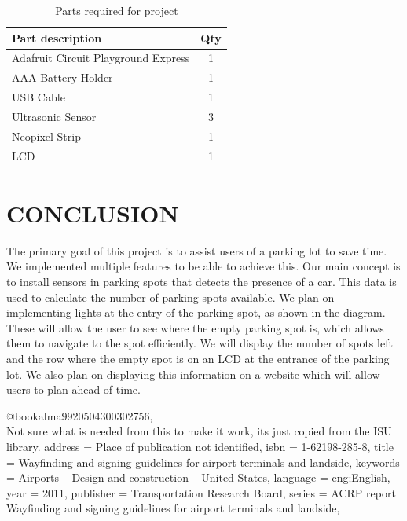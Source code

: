 \documentclass[12pt]{article}
\begin{document}
\begin{table}[!h]
  \caption{Parts required for project}
  \label{table:parts_list}
  \begin{center}
  \begin{tabular}{|p{3in}|c|}
  
  \hline
  Part description & Qty\\
  \hline
  \hline
  Adafruit Circuit Playground Express & 1 \\
  \hline
  AAA Battery Holder & 1 \\
  \hline
  USB Cable & 1 \\
  \hline
  Ultrasonic Sensor & 3 \\
  \hline
  Neopixel Strip & 1 \\
  \hline
  LCD & 1 \\
  \hline
  \end{tabular}
  \end{center}
\end{table}
\section{CONCLUSION}
The primary goal of this project is to assist users of a parking lot to save time. We implemented multiple features to be able to achieve this. Our main concept is to install sensors in parking spots that detects the presence of a car. This data is used to calculate the number of parking spots available. We plan on implementing lights at the entry of the parking spot, as shown in the diagram. These will allow the user to see where the empty parking spot is, which allows them to navigate to the spot efficiently. We will display the number of spots left and the row where the empty spot is on an LCD at the entrance of the parking lot. We also plan on displaying this information on a website which will allow users to plan ahead of time.

\newpage
\printbibliography[heading=subbibintoc]
@book{alma9920504300302756,  \\Not sure what is needed from this to make it work, its just copied from the ISU library.
address = {Place of publication not identified},
isbn = {1-62198-285-8},
title = {Wayfinding and signing guidelines for airport terminals and landside},
keywords = {Airports -- Design and construction -- United States},
language = {eng;English},
year = {2011},
publisher = {Transportation Research Board},
series = {ACRP report Wayfinding and signing guidelines for airport terminals and landside},
}
%
%
\end{document}
